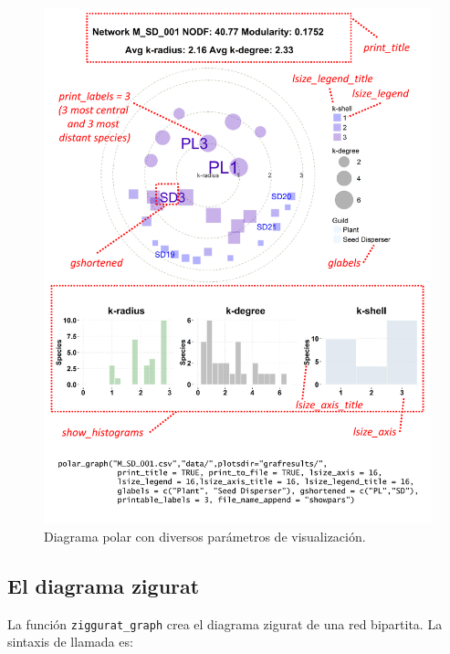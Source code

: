 \clearpage
\begin{figure}[ht!]
\centering
\includegraphics[scale=0.75]{ManFigs/polar_params.pdf}
\caption {Diagrama polar con diversos parámetros de visualización.}
\label{fig:AKMAN_polar_params}
\end{figure}

\clearpage
\subsection*{El diagrama zigurat}

\noindent La función \texttt{ziggurat\_graph} crea el diagrama zigurat de una red bipartita. La sintaxis de llamada es:

